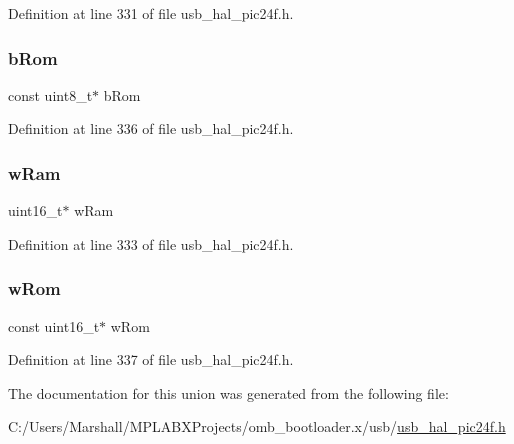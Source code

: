 Definition at line 331 of file usb\+\_\+hal\+\_\+pic24f.\+h.

\mbox{\label{union___p_o_i_n_t_e_r_ad199f0db405ddec97c0679ba019934e7}} 
\subsubsection{\texorpdfstring{bRom}{bRom}}
{\footnotesize\ttfamily const uint8\+\_\+t$\ast$ b\+Rom}



Definition at line 336 of file usb\+\_\+hal\+\_\+pic24f.\+h.

\mbox{\label{union___p_o_i_n_t_e_r_a7fbff1cee75fe5bc810c6872b4f7f2e7}} 
\subsubsection{\texorpdfstring{wRam}{wRam}}
{\footnotesize\ttfamily uint16\+\_\+t$\ast$ w\+Ram}



Definition at line 333 of file usb\+\_\+hal\+\_\+pic24f.\+h.

\mbox{\label{union___p_o_i_n_t_e_r_a6fd9e98c13e3aa04654f2c5ffd7e758f}} 
\subsubsection{\texorpdfstring{wRom}{wRom}}
{\footnotesize\ttfamily const uint16\+\_\+t$\ast$ w\+Rom}



Definition at line 337 of file usb\+\_\+hal\+\_\+pic24f.\+h.



The documentation for this union was generated from the following file\+:\begin{DoxyCompactItemize}
\item 
C\+:/\+Users/\+Marshall/\+M\+P\+L\+A\+B\+X\+Projects/omb\+\_\+bootloader.\+x/usb/\mbox{\hyperlink{usb__hal__pic24f_8h}{usb\+\_\+hal\+\_\+pic24f.\+h}}\end{DoxyCompactItemize}
